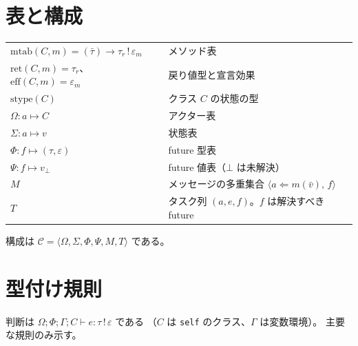 \documentclass[11pt,a4paper]{ltjsarticle}
\theoremstyle{definition}
\theoremstyle{remark}
\newcommand{\Om}{\Omega}
\newcommand{\Sm}{\Sigma}
\newcommand{\Ph}{\Phi}
\newcommand{\Ps}{\Psi}
\newcommand{\mtab}{\mathrm{mtab}}
\newcommand{\stype}{\mathrm{stype}}
\newcommand{\mret}{\mathrm{ret}}
\newcommand{\meff}{\mathrm{eff}}
\begin{document}
\section{表と構成}

\begin{center}
\small
\begin{tabular}{@{}ll@{}}
\toprule
$\mtab(C,m) = (\bar\tau) \to \tau_r \,!\, \varepsilon_m$ & メソッド表 \\
$\mret(C,m) = \tau_r$、$\meff(C,m) = \varepsilon_m$ & 戻り値型と宣言効果 \\
$\stype(C)$ & クラス $C$ の状態の型 \\
$\Om : a \mapsto C$ & アクター表 \\
$\Sm : a \mapsto v$ & 状態表 \\
$\Ph : f \mapsto (\tau, \varepsilon)$ & future 型表 \\
$\Ps : f \mapsto v_\bot$ & future 値表（$\bot$ は未解決）\\
$M$ & メッセージの多重集合 $\langle a \Leftarrow m(\bar v),\, f\rangle$ \\
$T$ & タスク列 $(a, e, f)$。$f$ は解決すべき future \\
\bottomrule
\end{tabular}
\end{center}

構成は $\mathcal{C} = \langle \Om, \Sm, \Ph, \Ps, M, T\rangle$ である。

\section{型付け規則}

判断は $\Om;\Ph;\Gamma;C \vdash e : \tau \,!\, \varepsilon$ である
（$C$ は \texttt{self} のクラス、$\Gamma$ は変数環境）。
主要な規則のみ示す。
\end{document}
